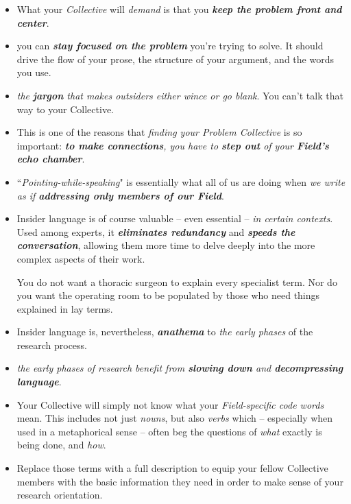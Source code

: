 \documentclass[11pt]{article}
\begin{document}
\begin{itemize}
\item What your \emph{Collective} will \emph{demand} is that you \emph{\textbf{keep the problem front and center}}. 

\item you can \emph{\textbf{stay focused on the problem}} you’re trying to solve. It should drive the flow of your prose, the structure of your argument, and the words you use.

\item \emph{the \textbf{jargon} that makes outsiders either wince or go blank}. You can’t talk that way to your Collective.

\item This is one of the reasons that \emph{finding your Problem Collective} is so important: \emph{\textbf{to make connections}, you have to \textbf{step out} of your \textbf{Field's echo chamber}}.

\item ``\emph{Pointing-while-speaking}" is essentially what all of us are doing when \emph{we write as if \textbf{addressing only members of our Field}}.

\item Insider language is of course valuable -- even essential -- \emph{in certain contexts}.  Used among experts, it \emph{\textbf{eliminates redundancy}} and \emph{\textbf{speeds the conversation}}, allowing them more time to delve deeply into the more complex aspects of their work.

You do not want a thoracic surgeon to explain every specialist term. Nor do you want the operating room to be populated by those who need things explained in lay terms.

\item Insider language is, nevertheless, \emph{\textbf{anathema}} to \emph{the early phases} of the research process. 

\item \emph{the early phases of research benefit from \textbf{slowing down} and \textbf{decompressing language}}. 

\item Your Collective will simply not know what your \emph{Field-specific code words} mean. This includes not just \emph{nouns}, but also \emph{verbs} which -- especially when used in a metaphorical sense -- often beg the questions of \emph{what} exactly is being done, and \emph{how}.

\item Replace those terms with a full description to equip your fellow Collective members with the basic information they need in order
to make sense of your research orientation.


\end{itemize}
\end{document}
